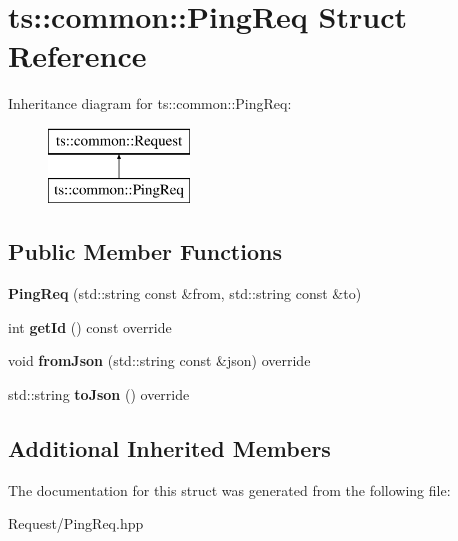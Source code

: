 \hypertarget{structts_1_1common_1_1_ping_req}{}\section{ts\+:\+:common\+:\+:Ping\+Req Struct Reference}
\label{structts_1_1common_1_1_ping_req}
Inheritance diagram for ts\+:\+:common\+:\+:Ping\+Req\+:\begin{figure}[H]
\begin{center}
\leavevmode
\includegraphics[height=2.000000cm]{structts_1_1common_1_1_ping_req}
\end{center}
\end{figure}
\subsection*{Public Member Functions}
\begin{DoxyCompactItemize}
\item 
\mbox{\label{structts_1_1common_1_1_ping_req_a9086ad567570fee92409bb791666ce38}} 
{\bfseries Ping\+Req} (std\+::string const \&from, std\+::string const \&to)
\item 
\mbox{\label{structts_1_1common_1_1_ping_req_aade4de990031733abcb7257744eeeae4}} 
int {\bfseries get\+Id} () const override
\item 
\mbox{\label{structts_1_1common_1_1_ping_req_a42de7cb0b189a256a844d26fd5c5e498}} 
void {\bfseries from\+Json} (std\+::string const \&json) override
\item 
\mbox{\label{structts_1_1common_1_1_ping_req_ab839ec43a055496f39fa209654ae4a6a}} 
std\+::string {\bfseries to\+Json} () override
\end{DoxyCompactItemize}
\subsection*{Additional Inherited Members}


The documentation for this struct was generated from the following file\+:\begin{DoxyCompactItemize}
\item 
Request/Ping\+Req.\+hpp\end{DoxyCompactItemize}
